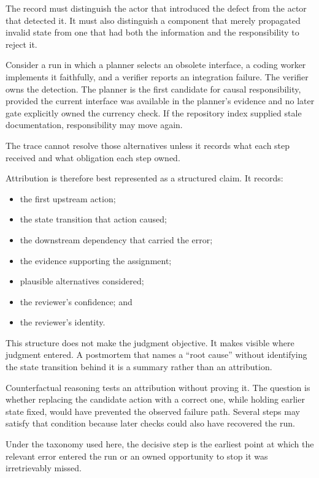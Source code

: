 The record must distinguish the actor that introduced the defect from the actor that detected it. It must also distinguish a component that merely propagated invalid state from one that had both the information and the responsibility to reject it.

Consider a run in which a planner selects an obsolete interface, a coding worker implements it faithfully, and a verifier reports an integration failure. The verifier owns the detection. The planner is the first candidate for causal responsibility, provided the current interface was available in the planner's evidence and no later gate explicitly owned the currency check. If the repository index supplied stale documentation, responsibility may move again.

The trace cannot resolve those alternatives unless it records what each step received and what obligation each step owned.


Attribution is therefore best represented as a structured claim. It records:

\begin{itemize}
\tightlist
\item
  the first upstream action;
\item
  the state transition that action caused;
\item
  the downstream dependency that carried the error;
\item
  the evidence supporting the assignment;
\item
  plausible alternatives considered;
\item
  the reviewer's confidence; and
\item
  the reviewer's identity.
\end{itemize}

This structure does not make the judgment objective. It makes visible where judgment entered. A postmortem that names a ``root cause'' without identifying the state transition behind it is a summary rather than an attribution.

Counterfactual reasoning tests an attribution without proving it. The question is whether replacing the candidate action with a correct one, while holding earlier state fixed, would have prevented the observed failure path. Several steps may satisfy that condition because later checks could also have recovered the run.

Under the taxonomy used here, the decisive step is the earliest point at which the relevant error entered the run or an owned opportunity to stop it was irretrievably missed.

